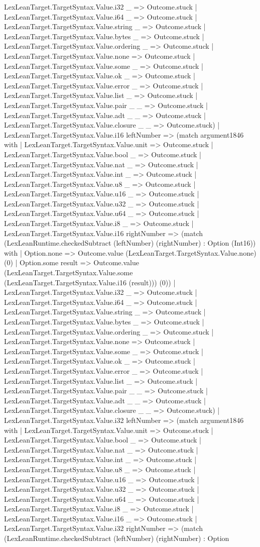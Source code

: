 \documentclass[11pt]{article}
\begin{document}
LexLeanTarget.TargetSyntax.Value.i32 \_ => Outcome.stuck | LexLeanTarget.TargetSyntax.Value.i64 \_ => Outcome.stuck | LexLeanTarget.TargetSyntax.Value.string \_ => Outcome.stuck | LexLeanTarget.TargetSyntax.Value.bytes \_ => Outcome.stuck | LexLeanTarget.TargetSyntax.Value.ordering \_ => Outcome.stuck | LexLeanTarget.TargetSyntax.Value.none => Outcome.stuck | LexLeanTarget.TargetSyntax.Value.some \_ => Outcome.stuck | LexLeanTarget.TargetSyntax.Value.ok \_ => Outcome.stuck | LexLeanTarget.TargetSyntax.Value.error \_ => Outcome.stuck | LexLeanTarget.TargetSyntax.Value.list \_ => Outcome.stuck | LexLeanTarget.TargetSyntax.Value.pair \_ \_ => Outcome.stuck | LexLeanTarget.TargetSyntax.Value.adt \_ \_ => Outcome.stuck | LexLeanTarget.TargetSyntax.Value.closure \_ \_ => Outcome.stuck) | LexLeanTarget.TargetSyntax.Value.i16 leftNumber => (match argument1846 with | LexLeanTarget.TargetSyntax.Value.unit => Outcome.stuck | LexLeanTarget.TargetSyntax.Value.bool \_ => Outcome.stuck | LexLeanTarget.TargetSyntax.Value.nat \_ => Outcome.stuck | LexLeanTarget.TargetSyntax.Value.int \_ => Outcome.stuck | LexLeanTarget.TargetSyntax.Value.u8 \_ => Outcome.stuck | LexLeanTarget.TargetSyntax.Value.u16 \_ => Outcome.stuck | LexLeanTarget.TargetSyntax.Value.u32 \_ => Outcome.stuck | LexLeanTarget.TargetSyntax.Value.u64 \_ => Outcome.stuck | LexLeanTarget.TargetSyntax.Value.i8 \_ => Outcome.stuck | LexLeanTarget.TargetSyntax.Value.i16 rightNumber => (match (LexLeanRuntime.checkedSubtract (leftNumber) (rightNumber) : Option (Int16)) with | Option.none => Outcome.value (LexLeanTarget.TargetSyntax.Value.none) (0) | Option.some result => Outcome.value (LexLeanTarget.TargetSyntax.Value.some (LexLeanTarget.TargetSyntax.Value.i16 (result))) (0)) | LexLeanTarget.TargetSyntax.Value.i32 \_ => Outcome.stuck | LexLeanTarget.TargetSyntax.Value.i64 \_ => Outcome.stuck | LexLeanTarget.TargetSyntax.Value.string \_ => Outcome.stuck | LexLeanTarget.TargetSyntax.Value.bytes \_ => Outcome.stuck | LexLeanTarget.TargetSyntax.Value.ordering \_ => Outcome.stuck | LexLeanTarget.TargetSyntax.Value.none => Outcome.stuck | LexLeanTarget.TargetSyntax.Value.some \_ => Outcome.stuck | LexLeanTarget.TargetSyntax.Value.ok \_ => Outcome.stuck | LexLeanTarget.TargetSyntax.Value.error \_ => Outcome.stuck | LexLeanTarget.TargetSyntax.Value.list \_ => Outcome.stuck | LexLeanTarget.TargetSyntax.Value.pair \_ \_ => Outcome.stuck | LexLeanTarget.TargetSyntax.Value.adt \_ \_ => Outcome.stuck | LexLeanTarget.TargetSyntax.Value.closure \_ \_ => Outcome.stuck) | LexLeanTarget.TargetSyntax.Value.i32 leftNumber => (match argument1846 with | LexLeanTarget.TargetSyntax.Value.unit => Outcome.stuck | LexLeanTarget.TargetSyntax.Value.bool \_ => Outcome.stuck | LexLeanTarget.TargetSyntax.Value.nat \_ => Outcome.stuck | LexLeanTarget.TargetSyntax.Value.int \_ => Outcome.stuck | LexLeanTarget.TargetSyntax.Value.u8 \_ => Outcome.stuck | LexLeanTarget.TargetSyntax.Value.u16 \_ => Outcome.stuck | LexLeanTarget.TargetSyntax.Value.u32 \_ => Outcome.stuck | LexLeanTarget.TargetSyntax.Value.u64 \_ => Outcome.stuck | LexLeanTarget.TargetSyntax.Value.i8 \_ => Outcome.stuck | LexLeanTarget.TargetSyntax.Value.i16 \_ => Outcome.stuck | LexLeanTarget.TargetSyntax.Value.i32 rightNumber => (match (LexLeanRuntime.checkedSubtract (leftNumber) (rightNumber) : Option 
\end{document}
